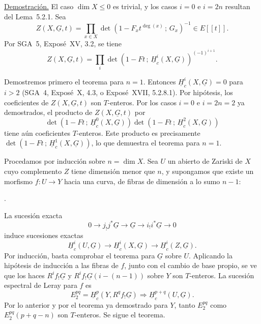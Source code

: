 \noindent\underline{Demostración.}
El caso $\dim X\leq0$ es trivial, y los casos $i=0$ e $i=2n$ resultan del
Lema~5.2.1. Sea
\[
Z(X,\underline G,t)=
\prod_{x\in X}\det\!\left(1-F_xt^{\deg(x)}\,;\,G_x\right)^{-1}
\in E[[t]].
\]
Por SGA~5, Exposé~XV, 3.2, se tiene
\begin{equation}\tag{5.2.3}
Z(X,\underline G,t)=
\prod_i\det\!\left(1-Ft\,;\,
\underline H_c^i(X,\underline G)\right)^{(-1)^{i+1}}.
\end{equation}

Demostremos primero el teorema para $n=1$. Entonces
$\underline H_c^i(X,\underline G)=0$ para $i>2$ (SGA~4, Exposé~X, 4.3,
o Exposé~XVII, 5.2.8.1). Por hipótesis, los coeficientes de
$Z(X,\underline G,t)$ son $T$-enteros. Por los casos $i=0$ e $i=2n=2$
ya demostrados, el producto de $Z(X,\underline G,t)$ por
\[
\det\!\left(1-Ft\,;\,\underline H_c^0(X,\underline G)\right)
\det\!\left(1-Ft\,;\,\underline H_c^2(X,\underline G)\right)
\]
tiene aún coeficientes $T$-enteros. Este producto es precisamente
$\det(1-Ft\,;\,\underline H_c^1(X,\underline G))$, lo que demuestra el
teorema para $n=1$.

Procedamos por inducción sobre $n=\dim X$. Sea $U$ un abierto de Zariski
de $X$ cuyo complemento $Z$ tiene dimensión menor que $n$, y supongamos
que existe un morfismo $f:U\longrightarrow Y$ hacia una curva, de fibras
de dimensión a lo sumo $n-1$:

\pageoriginale

\begin{center}
\qquad .
\end{center}
La sucesión exacta
\[
0\longrightarrow j_!j^*\underline G\longrightarrow\underline G
\longrightarrow i_!i^*\underline G\longrightarrow0
\]
induce sucesiones exactas
\[
\underline H_c^i(U,\underline G)\longrightarrow
\underline H_c^i(X,\underline G)\longrightarrow
\underline H_c^i(Z,\underline G).
\]
Por inducción, basta comprobar el teorema para $\underline G$ sobre $U$.
Aplicando la hipótesis de inducción a las fibras de $f$, junto con el
cambio de base propio, se ve que los haces $R^if_!\underline G$ y
$R^if_!\underline G(i-(n-1))$ sobre $Y$ son $T$-enteros. La sucesión
espectral de Leray para $f$ es
\[
E_2^{pq}=\underline H_c^p(Y,R^qf_!\underline G)
\Longrightarrow\underline H_c^{p+q}(U,\underline G).
\]
Por lo anterior y por el teorema ya demostrado para $Y$, tanto $E_2^{pq}$
como $E_2^{pq}(p+q-n)$ son $T$-enteros. Se sigue el teorema.

